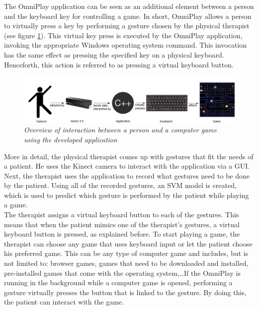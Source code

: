 The OmniPlay application can be seen as an additional element between a person and the keyboard key for controlling a game. In short, OmniPlay allows a person to virtually press a key by performing a gesture chosen by the physical therapist (see figure \ref{fig: overview_application_interaction}). This virtual key press is executed by the OmniPlay application, invoking the appropriate Windows operating system command. This invocation has the same effect as pressing the specified key on a physical keyboard. Henceforth, this action is referred to as pressing a virtual keyboard button.\\

\begin{figure}[H]
\begin{center}
\includegraphics[width=14cm]{Concept2.png}
\caption{\emph{Overview of interaction between a person and a computer game using the developed application}}
\label{fig: overview_application_interaction}
\end{center}
\end{figure}

More in detail, the physical therapist comes up with gestures that fit the needs of a patient. He uses the Kinect camera to interact with the application via a GUI. Next, the therapist uses the application to record what gestures need to be done by the patient. Using all of the recorded gestures, an SVM model is created, which is used to predict which gesture is performed by the patient while playing a game.\\

The therapist assigns a virtual keyboard button to each of the gestures. This means that when the patient mimics one of the therapist's gestures, a virtual keyboard button is pressed, as explained before. To start playing a game, the therapist can choose any game that uses keyboard input or let the patient choose his preferred game. This can be any type of computer game and includes, but is not limited to: browser games, games that need to be downloaded and installed, pre-installed games that come with the operating system,\ldots If the OmniPlay is running in the background while a computer game is opened, performing a gesture virtually presses the button that is linked to the gesture. By doing this, the patient can interact with the game.\\

